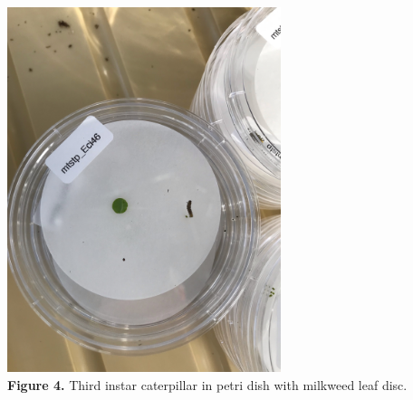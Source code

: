 \documentclass{article}
\begin{document}
\begin{multicols}{2}
    \includegraphics[width=80mm]{../../images/third_instar_in_leaf_disc_dish.jpg} \\
    \caption{\textbf{Figure 4.} Third instar caterpillar in petri dish with milkweed leaf disc.}


\end{multicols}
\end{document}
